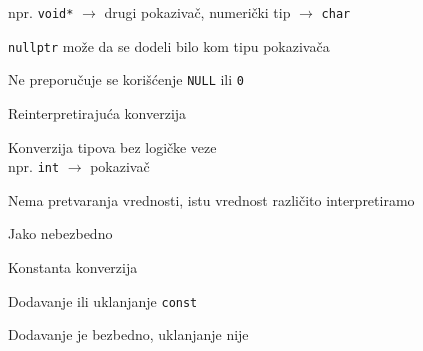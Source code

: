 \documentclass{article}
\newenvironment{xitemize}{%
    
    \itemize
    \larger
}{%
    \enditemize
}
\let\olditemize\itemize
\let\endolditemize\enditemize
\renewenvironment{itemize}{%
    \smaller
    \olditemize
}{%
    \endolditemize
}
\providecommand{\inlinecode}[1]{\texttt{#1}}
\begin{document}
\begin{xitemize}
\begin{itemize}
    npr. \inlinecode{void*} $\rightarrow$ drugi pokazivač, numerički tip $\rightarrow$ \inlinecode{char}
    \item \inlinecode{nullptr} može da se dodeli bilo kom tipu pokazivača
    \item Ne preporučuje se korišćenje \inlinecode{NULL} ili \inlinecode0
\end{itemize}
\item Reinterpretirajuća konverzija
\begin{itemize}
    \item Konverzija tipova bez logičke veze\\
    npr. \inlinecode{int} $\rightarrow$ pokazivač
    \item Nema pretvaranja vrednosti, istu vrednost različito interpretiramo
    \item Jako nebezbedno
\end{itemize}
\item Konstanta konverzija
\begin{itemize}
    \item Dodavanje ili uklanjanje \inlinecode{const}
    \item Dodavanje je bezbedno, uklanjanje nije
\end{itemize}
\end{xitemize}
\newpage
\end{document}
